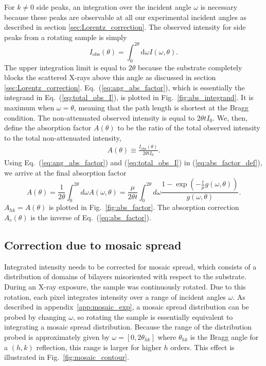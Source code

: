 For $k\neq 0$ side peaks, an integration over the incident angle $\omega$
is necessary because these peaks are observable at all our experimental incident angles as
described in section \ref{sec:Lorentz_correction}.
The observed intensity for side peaks from a rotating sample is simply
\begin{equation}
  I_\textrm{obs}(\theta) 
  = \int_0^{2\theta}\textrm{d}\omega I(\omega,\theta).
  \label{eq:total_obs_I}
\end{equation}
The upper integration limit is equal to $2\theta$ because the substrate
completely blocks the scattered X-rays above this angle as discussed in 
section \ref{sec:Lorentz_correction}. Eq.~(\ref{eq:ang_abs_factor}),
which is essentially the integrand in Eq.~(\ref{eq:total_obs_I}), is 
plotted in Fig.~\ref{fig:abs_integrand}. It is maximum when $\omega=\theta$,
meaning that the path length is shortest at the Bragg condition.
The non-attenuated observed intensity is equal to $2\theta t I_0$. We, then, 
define the absorption factor $A(\theta)$ to be the ratio of the total 
observed intensity to the total non-attenuated intensity,
\begin{align}
  A(\theta) \equiv \frac{I_\textrm{obs}(\theta)}{2\theta tI_0}. 
  \label{eq:abs_factor_def}
\end{align}
Using Eq.~(\ref{eq:ang_abs_factor}) and (\ref{eq:total_obs_I})
in (\ref{eq:abs_factor_def}), we arrive
at the final absorption factor
\begin{equation}
  A(\theta) = \frac{1}{2\theta}\int_0^{2\theta}d\omega A(\omega,\theta)
  = \frac{\mu}{2\theta t} \int_0^{2\theta}d\omega 
  \frac{1-\exp\left(-\frac{t}{\mu}g(\omega,\theta)\right)}{g(\omega,\theta)}.
  \label{eq:abs_factor}
\end{equation}
$A_{hk} = A(\theta)$ is plotted in Fig.~\ref{fig:abs_factor}.
The absorption correction $A_c(\theta)$ is the inverse of Eq.~(\ref{eq:abs_factor}). 

\subsection{Correction due to mosaic spread}\label{sec:mosaic_spread_correction}
Integrated intensity needs to be corrected for mosaic spread, which consists 
of a distribution of domains of bilayers misoriented with respect to the 
substrate. 
During an X-ray exposure, the sample
was continuously rotated. Due to this rotation, each pixel integrates 
intensity over a range of incident angles $\omega$.
As described in appendix~\ref{app:mosaic_exp}, 
a mosaic spread distribution can be probed
by changing $\omega$, so rotating the sample is essentially  
equivalent to integrating a mosaic spread distribution.
Because the range of the distribution probed is approximately given by $\omega=[0, 2\theta_{hk}]$ 
where $\theta_{hk}$ is the Bragg angle for a $(h,k)$ reflection, 
this range is larger for higher $h$ orders. 
This effect is illustrated in Fig.~\ref{fig:mosaic_contour}.


